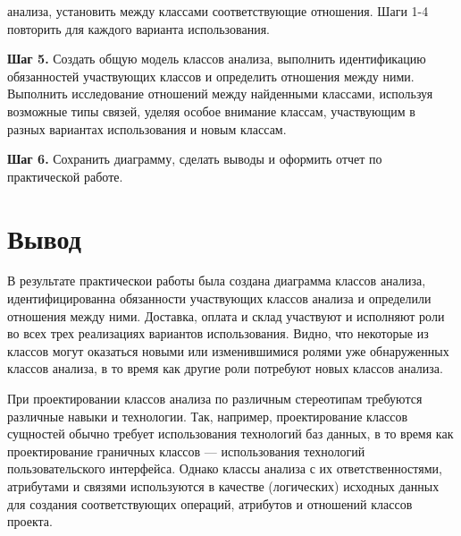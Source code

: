 \begin{enumerate}
		анализа, установить между классами соответствующие отношения.
		Шаги 1-4 повторить для каждого варианта использования.\par
		\textbf{Шаг 5.} Создать общую модель классов анализа,
		выполнить идентификацию обязанностей участвующих классов и определить
		отношения между ними. Выполнить исследование отношений между
		найденными классами, используя возможные типы связей, уделяя особое
		внимание классам, участвующим в разных вариантах использования
		и новым классам.\par
		\textbf{Шаг 6.} Сохранить диаграмму, сделать выводы и оформить
		отчет по практической работе.\par
\end{enumerate}

\newpage

\section*{\LARGE Вывод}
В результате практическои работы была создана диаграмма классов анализа,
идентифицированна обязанности участвующих классов анализа и определили
отношения между ними. Доставка, оплата и склад участвуют и
исполняют роли во всех трех реализациях вариантов использования. Видно,
что некоторые из классов могут оказаться новыми или изменившимися ролями
уже обнаруженных классов анализа, в то время как другие роли потребуют
новых классов анализа.\par
При проектировании классов анализа по различным стереотипам требуются
различные навыки и технологии. Так, например, проектирование классов
сущностей обычно требует использования технологий баз данных, в то время
как проектирование граничных классов — использования технологий
пользовательского интерфейса. Однако классы анализа с их ответственностями,
атрибутами и связями используются в качестве (логических) исходных данных
для создания соответствующих операций, атрибутов и отношений классов
проекта.
